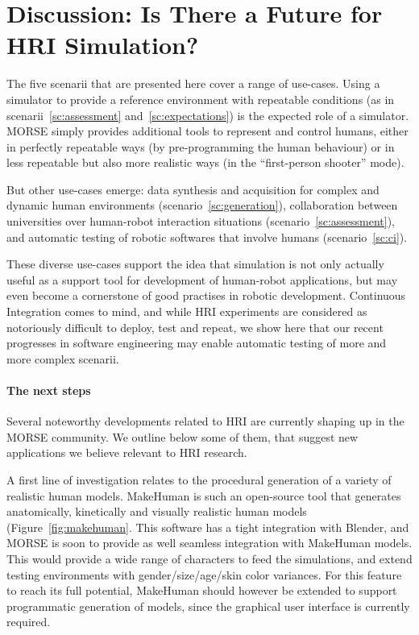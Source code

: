 \documentclass[conference]{IEEEtran}
\begin{document}
\section{Discussion: Is There a Future for HRI Simulation?}

The five scenarii that are presented here cover a range of use-cases. Using a
simulator to provide a reference environment with repeatable conditions (as in
scenarii~\ref{sc:assessment} and~\ref{sc:expectations}) is the expected role of
a simulator. MORSE simply provides additional tools to represent and control
humans, either in perfectly repeatable ways (by pre-programming the human
behaviour) or in less repeatable but also more realistic ways (in the
``first-person shooter'' mode).

But other use-cases emerge: data synthesis and acquisition for complex and
dynamic human environments (scenario~\ref{sc:generation}), collaboration between
universities over human-robot interaction situations
(scenario~\ref{sc:assessment}), and automatic testing of robotic softwares that
involve humans (scenario~\ref{sc:ci}).

These diverse use-cases support the idea that simulation is not only actually
useful as a support tool for development of human-robot applications, but may
even become a cornerstone of good practises in robotic development. Continuous
Integration comes to mind, and while HRI experiments are considered as
notoriously difficult to deploy, test and repeat, we show here that our recent
progresses in software engineering may enable automatic testing of more and more
complex scenarii.

\paragraph*{The next steps}

Several noteworthy developments related to HRI are currently shaping up in the
MORSE community. We outline below some of them, that suggest new applications we
believe relevant to HRI research.

A first line of investigation relates to the procedural generation of a variety
of realistic human models. {\sc MakeHuman} is such an open-source tool that
generates anatomically, kinetically and visually realistic human models
(Figure~\ref{fig:makehuman}. This software has a tight integration with Blender,
and MORSE is soon to provide as well seamless integration with {\sc MakeHuman}
models. This would provide a wide range of characters to feed the simulations,
and extend testing environments with gender/size/age/skin color variances.  For
this feature to reach its full potential, {\sc MakeHuman} should however be
extended to support programmatic generation of models, since the graphical user
interface is currently required.
\end{document}
